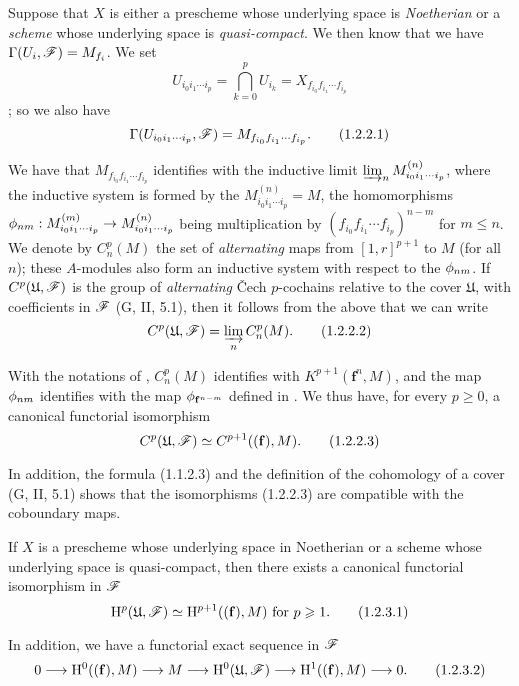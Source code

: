 \begin{env}[1.2.2]
\label{3.1.2.2}
Suppose that $X$ is either a prescheme whose underlying space is \emph{Noetherian} or a \emph{scheme} whose underlying space is \emph{quasi-compact}.
We then know  that we have $\Gamma(U_i,\mathscr{F})=M_{f_i}$.
We set
\[
  U_{i_0 i_1\cdots i_p}=\bigcap_{k=0}^p U_{i_k}=X_{f_{i_0}f_{i_1}\cdots f_{i_p}}
\]
; so we also have
\[
  \Gamma(U_{i_0 i_1\cdots i_p},\mathscr{F})=M_{f_{i_0}f_{i_1}\cdots f_{i_p}}.
  \tag{1.2.2.1}
\]

We have  that $M_{f_{i_0}f_{i_1}\cdots f_{i_p}}$ identifies with the inductive limit $\varinjlim_n M_{i_0 i_1\cdots i_p}^{(n)}$, where the inductive system is formed by the $M_{i_0 i_1\cdots i_p}^{(n)}=M$, the homomorphisms $\vphi_{nm}:M_{i_0 i_1\cdots i_p}^{(m)}\to M_{i_0 i_1\cdots i_p}^{(n)}$ being multiplication by $(f_{i_0}f_{i_1}\cdots f_{i_p})^{n-m}$ for $m\leq n$.
We denote by $C_n^p(M)$ the set of \emph{alternating} maps from $[1,r]^{p+1}$ to $M$ (for all $n$); these $A$-modules also form an inductive system with respect to the $\phi_{nm}$.
If $C^p(\mathfrak{U},\mathscr{F})$ is the group of \emph{alternating} \v Cech $p$-cochains relative to the cover $\mathfrak{U}$, with coefficients in $\mathscr{F}$ (G, II, 5.1), then it follows from the above that we can write
\[
  C^p(\mathfrak{U},\mathscr{F})=\varinjlim_n C_n^p(M).
  \tag{1.2.2.2}
\]

With the notations of , $C_n^p(M)$ identifies with $K^{p+1}(\mathbf{f}^n,M)$, and the map $\phi_{nm}$ identifies with the map $\phi_{\mathbf{f}^{n-m}}$ defined in .
We thus have, for every $p\geq 0$, a canonical functorial isomorphism
\[
  C^p(\mathfrak{U},\mathscr{F})\simeq C^{p+1}((\mathbf{f}),M).
  \tag{1.2.2.3}
\]

In addition, the formula (1.1.2.3) and the definition of the cohomology of a cover (G, II, 5.1) shows that the isomorphisms (1.2.2.3) are compatible with the coboundary maps.
\end{env}

\begin{proposition}[1.2.3]
\label{3.1.2.3}
If $X$ is a prescheme whose underlying space in Noetherian or a scheme whose underlying space is quasi-compact, then there exists a canonical functorial isomorphism in $\mathscr{F}$
\[
  \mathrm{H}^p(\mathfrak{U},\mathscr{F})\simeq\mathrm{H}^{p+1}((\mathbf{f}),M)\text{ for }p\geqslant 1.
  \tag{1.2.3.1}
\]

In addition, we have a functorial exact sequence in $\mathscr{F}$
\[
  0\to\HH^0((\mathbf{f}),M)\to M\to\HH^0(\mathfrak{U},\sh{F})\to\HH^1((\mathbf{f}),M)\to 0.
  \tag{1.2.3.2}
\]
\end{proposition}

